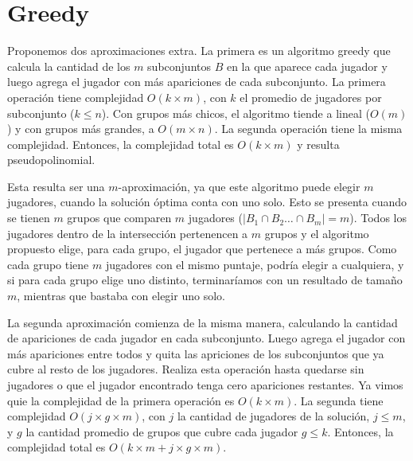 \section{Greedy}

Proponemos dos aproximaciones extra. La primera es un algoritmo greedy que calcula la cantidad de los $m$ subconjuntos $B$ en la que aparece cada jugador y luego agrega el jugador con más apariciones de cada subconjunto. La primera operación tiene complejidad $O(k \times m)$, con $k$ el promedio de jugadores por subconjunto ($k \leq n$). Con grupos más chicos, el algoritmo tiende a lineal ($O(m)$) y con grupos más grandes, a $O(m\times n)$. La segunda operación tiene la misma complejidad. Entonces, la complejidad total es $O(k \times m)$ y resulta pseudopolinomial. %

Esta resulta ser una $m$-aproximación, ya que este algoritmo puede elegir $m$ jugadores, cuando la solución óptima conta con uno solo. Esto se presenta cuando se tienen $m$ grupos que comparen $m$ jugadores ($\left|B_1 \cap B_2 \dots \cap B_m\right| = m$). Todos los jugadores dentro de la intersección pertenencen a $m$ grupos y el algoritmo propuesto elige, para cada grupo, el jugador que pertenece a más grupos. Como cada grupo tiene $m$ jugadores con el mismo puntaje, podría elegir a cualquiera, y si para cada grupo elige uno distinto, terminaríamos con un resultado de tamaño $m$, mientras que bastaba con elegir uno solo.

La segunda aproximación comienza de la misma manera, calculando la cantidad de apariciones de cada jugador en cada subconjunto. Luego agrega el jugador con más apariciones entre todos y quita las apriciones de los subconjuntos que ya cubre al resto de los jugadores. Realiza esta operación hasta quedarse sin jugadores o que el jugador encontrado tenga cero apariciones restantes. Ya vimos quie la complejidad de la primera operación es $O(k \times m)$. La segunda tiene complejidad $O(j \times g \times m)$, con $j$ la cantidad de jugadores de la solución, $j \leq m$, y $g$ la cantidad promedio de grupos que cubre cada jugador $g \leq k$. Entonces, la complejidad total es $O(k \times m + j \times g \times m)$. %

    